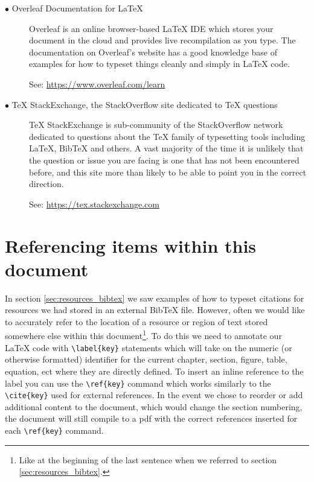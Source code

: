 	\begin{description}	
			
		\item[$\bullet$ Overleaf Documentation for LaTeX]\hfill
		
		Overleaf \cite{overleafdocs} is an online browser-based LaTeX IDE which stores your document in the cloud and provides live recompilation as you type. The documentation on Overleaf's website has a good knowledge base of examples for how to typeset things cleanly and simply in LaTeX code. 
		
		\noindent See: {\small \url{https://www.overleaf.com/learn}}
		
		\item[$\bullet$ TeX StackExchange, the StackOverflow site dedicated to TeX questions]\hfill
		
		TeX StackExchange \cite{texstackexchange} is sub-community of the StackOverflow network dedicated to questions about the TeX family of typesetting tools including LaTeX, BibTeX and others. A vast majority of the time it is unlikely that the question or issue you are facing is one that has not been encountered before, and this site more than likely to be able to point you in the correct direction. 
		
		\noindent See: {\small \url{https://tex.stackexchange.com}}
		
	\end{description}
	
	\newpage 
		
	\section{Referencing items within this document}
		In section \ref{sec:resources_bibtex} we saw examples of how to typeset citations for resources we had stored in an external BibTeX file. However, often we would like to accurately refer to the location of a resource or region of text stored somewhere else within this document\footnote{Like at the beginning of the last sentence when we referred to section \ref{sec:resources_bibtex}.}. To do this we need to annotate our LaTeX code with \lstinline|\label{key}| statements which will take on the numeric (or otherwise formatted) identifier for the current chapter, section, figure, table, equation, ect where they are directly defined. To insert an inline reference to the label you can use the \lstinline|\ref{key}| command which works similarly to the \lstinline|\cite{key}| used for external references. In the event we chose to reorder or add additional content to the document, which would change the section numbering, the document will still compile to a pdf with the correct references inserted for each \lstinline|\ref{key}| command.
		
	
		
	
	
	
	
	
	
